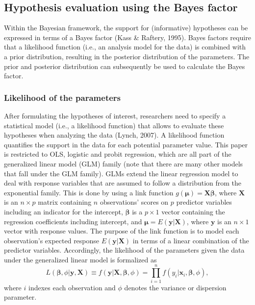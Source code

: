 \documentclass[
]{interact}
\begin{document}
\hypertarget{hypothesis-evaluation-using-the-bayes-factor}{%
\subsection{Hypothesis evaluation using the Bayes
factor}\label{hypothesis-evaluation-using-the-bayes-factor}}

Within the Bayesian framework, the support for (informative) hypotheses
can be expressed in terms of a Bayes factor (Kass \& Raftery, 1995).
Bayes factors require that a likelihood function (i.e., an analysis
model for the data) is combined with a prior distribution, resulting in
the posterior distribution of the parameters. The prior and posterior
distribution can subsequently be used to calculate the Bayes factor.

\hypertarget{likelihood-of-the-parameters}{%
\subsubsection{Likelihood of the
parameters}\label{likelihood-of-the-parameters}}

After formulating the hypotheses of interest, researchers need to
specify a statistical model (i.e., a likelihood function) that allows to
evaluate these hypotheses when analyzing the data (Lynch, 2007). A
likelihood function quantifies the support in the data for each
potential parameter value. This paper is restricted to OLS, logistic and
probit regression, which are all part of the generalized linear model
(GLM) family (note that there are many other models that fall under the
GLM family). GLMs extend the linear regression model to deal with
response variables that are assumed to follow a distribution from the
exponential family. This is done by using a link function
\(g(\boldsymbol{\mu}) = \boldsymbol{X} \boldsymbol{\beta}\), where
\(\boldsymbol{X}\) is an \(n \times p\) matrix containing \(n\)
observations' scores on \(p\) predictor variables including an indicator
for the intercept, \(\boldsymbol{\beta}\) is a \(p \times 1\) vector
containing the regression coefficients including intercept, and
\(\boldsymbol{\mu} = E(\boldsymbol{y}|\boldsymbol{X})\), where
\(\boldsymbol{y}\) is an \(n \times 1\) vector with response values. The
purpose of the link function is to model each observation's expected
response \(E(\boldsymbol{y}|\boldsymbol{X})\) in terms of a linear
combination of the predictor variables. Accordingly, the likelihood of
the parameters given the data under the generalized linear model is
formalized as \[
L(\boldsymbol{\beta}, \phi| \boldsymbol{y}, \boldsymbol{X}) \equiv 
f(\boldsymbol{y}|\boldsymbol{X}, \boldsymbol{\beta}, \phi) = 
\prod^n_{i=1} f(y_i|\boldsymbol{x}_i, \boldsymbol{\beta}, \phi),
\] where \(i\) indexes each observation and \(\phi\) denotes the
variance or dispersion parameter.
\end{document}
